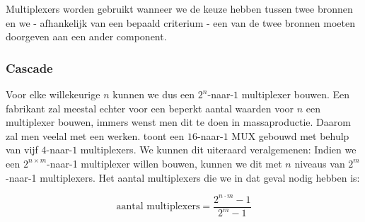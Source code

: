 Multiplexers worden gebruikt wanneer we de keuze hebben tussen twee bronnen en we - afhankelijk van een bepaald criterium - een van de twee bronnen moeten doorgeven aan een ander component.

\subsubsection{Cascade}
Voor elke willekeurige $n$ kunnen we dus een $2^n$-naar-$1$ multiplexer bouwen. Een fabrikant zal meestal echter voor een beperkt aantal waarden voor $n$ een multiplexer bouwen, immers wenst men dit te doen in massaproductie. Daarom zal men veelal met een  werken.  toont een $16$-naar-$1$ MUX gebouwd met behulp van vijf $4$-naar-$1$ multiplexers. We kunnen dit uiteraard veralgemenen: Indien we een $2^{n\times m}$-naar-1 multiplexer willen bouwen, kunnen we dit met $n$ niveaus van $2^m$-naar-1 multiplexers. Het aantal multiplexers die we in dat geval nodig hebben is:

\begin{equation}
\mbox{aantal multiplexers}=\displaystyle\frac{2^{n\cdot m}-1}{2^m-1}
\end{equation}

